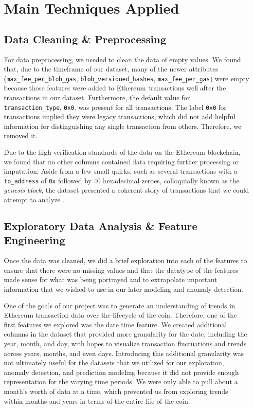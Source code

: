 \documentclass[sigconf]{acmart}
\begin{document}
\section{Main Techniques Applied}


\subsection{Data Cleaning \& Preprocessing}
For data preprocessing, we needed to clean the data of empty values. We found that, due to the timeframe of our dataset, many of the newer attributes (\texttt{max\_fee\_per\_blob\_gas}, \texttt{blob\_versioned\_hashes}, \texttt{max\_fee\_per\_gas}) were empty because those features were added to Ethereum transactions well after the transactions in our dataset. Furthermore, the default value for \texttt{transaction\_type}, \texttt{0x0}, was present for all transactions. The label \texttt{0x0} for transactions implied they were legacy transactions, which did not add helpful information for distinguishing any single transaction from others. Therefore, we removed it.

Due to the high verification standards of the data on the Ethereum blockchain, we found that no other columns contained data requiring further processing or imputation. Aside from a few small quirks, such as several transactions with a \texttt{to\_address} of \texttt{0x} followed by 40 hexadecimal zeroes, colloquially known as the \textit{genesis block}, the dataset presented a coherent story of transactions that we could attempt to analyze \cite{GenesisBlock}.

\subsection{Exploratory Data Analysis \& Feature Engineering}

Once the data was cleaned, we did a brief exploration into each of the features to ensure that there were no missing values and that the datatype of the features made sense for what was being portrayed and to extrapolate important information that we wished to use in our later modeling and anomaly detection.  

One of the goals of our project was to generate an understanding of trends in Ethereum transaction data over the lifecycle of the coin. Therefore, one of the first features we explored was the date time feature. We created additional columns in the dataset that provided more granularity for the date, including the year, month, and day, with hopes to visualize transaction fluctuations and trends across years, months, and even days. Introducing this additional granularity was not ultimately useful for the datasets that we utilized for our exploration, anomaly detection, and prediction modeling because it did not provide enough representation for the varying time periods. We were only able to pull about a month’s worth of data at a time, which prevented us from exploring trends within months and years in terms of the entire life of the coin.
\end{document}
